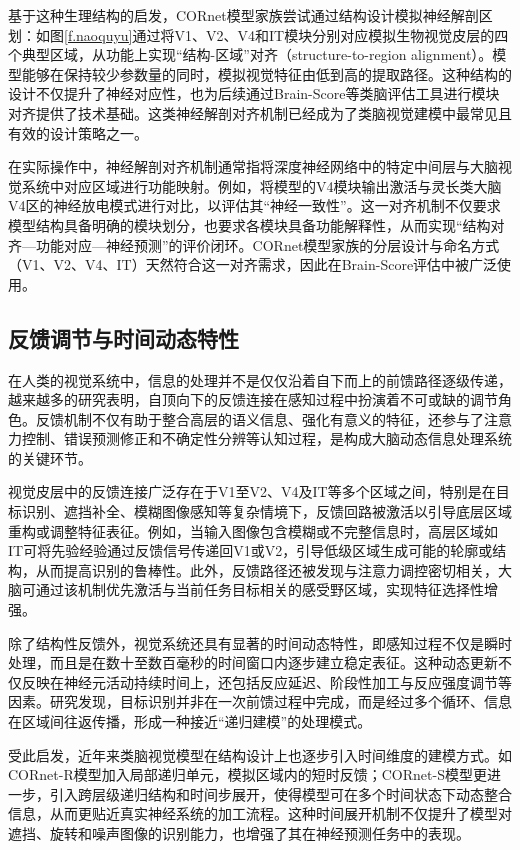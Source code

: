 基于这种生理结构的启发，CORnet模型家族尝试通过结构设计模拟神经解剖区划：如图\ref{f.naoquyu}通过将V1、V2、V4和IT模块分别对应模拟生物视觉皮层的四个典型区域，从功能上实现“结构-区域”对齐（structure-to-region alignment）。模型能够在保持较少参数量的同时，模拟视觉特征由低到高的提取路径。这种结构的设计不仅提升了神经对应性，也为后续通过Brain-Score等类脑评估工具进行模块对齐提供了技术基础。这类神经解剖对齐机制已经成为了类脑视觉建模中最常见且有效的设计策略之一。

在实际操作中，神经解剖对齐机制通常指将深度神经网络中的特定中间层与大脑视觉系统中对应区域进行功能映射。例如，将模型的V4模块输出激活与灵长类大脑V4区的神经放电模式进行对比，以评估其“神经一致性”。这一对齐机制不仅要求模型结构具备明确的模块划分，也要求各模块具备功能解释性，从而实现“结构对齐—功能对应—神经预测”的评价闭环。CORnet模型家族的分层设计与命名方式（V1、V2、V4、IT）天然符合这一对齐需求，因此在Brain-Score评估中被广泛使用。

\subsection{反馈调节与时间动态特性}

在人类的视觉系统中，信息的处理并不是仅仅沿着自下而上的前馈路径逐级传递，越来越多的研究表明，自顶向下的反馈连接在感知过程中扮演着不可或缺的调节角色。反馈机制不仅有助于整合高层的语义信息、强化有意义的特征，还参与了注意力控制、错误预测修正和不确定性分辨等认知过程，是构成大脑动态信息处理系统的关键环节。

视觉皮层中的反馈连接广泛存在于V1至V2、V4及IT等多个区域之间，特别是在目标识别、遮挡补全、模糊图像感知等复杂情境下，反馈回路被激活以引导底层区域重构或调整特征表征。例如，当输入图像包含模糊或不完整信息时，高层区域如IT可将先验经验通过反馈信号传递回V1或V2，引导低级区域生成可能的轮廓或结构，从而提高识别的鲁棒性\cite{wyatte2014early}。此外，反馈路径还被发现与注意力调控密切相关，大脑可通过该机制优先激活与当前任务目标相关的感受野区域，实现特征选择性增强\cite{bastos2012canonical}。

除了结构性反馈外，视觉系统还具有显著的时间动态特性，即感知过程不仅是瞬时处理，而且是在数十至数百毫秒的时间窗口内逐步建立稳定表征。这种动态更新不仅反映在神经元活动持续时间上，还包括反应延迟、阶段性加工与反应强度调节等因素。研究发现，目标识别并非在一次前馈过程中完成，而是经过多个循环、信息在区域间往返传播，形成一种接近“递归建模”的处理模式\cite{kar2019evidence}。

受此启发，近年来类脑视觉模型在结构设计上也逐步引入时间维度的建模方式。如CORnet-R模型加入局部递归单元，模拟区域内的短时反馈；CORnet-S模型更进一步，引入跨层级递归结构和时间步展开，使得模型可在多个时间状态下动态整合信息，从而更贴近真实神经系统的加工流程\cite{kubilius2019brain}。这种时间展开机制不仅提升了模型对遮挡、旋转和噪声图像的识别能力，也增强了其在神经预测任务中的表现。

